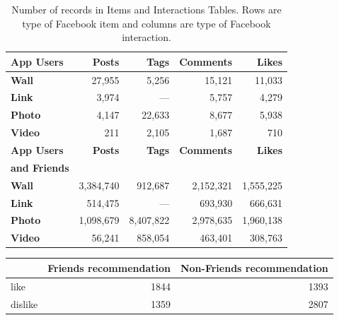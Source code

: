 \documentclass[letterpaper]{article}
\begin{document}
\begin{table}
	\centering
		\begin{tabular}{|>{\small}l|>{\small}r|>{\small}r|>{\small}r|>{\small}r|}
			\hline

			\textbf{App Users} & \textbf{Posts} & \textbf{Tags} & \textbf{Comments} & \textbf{Likes} \\
			\hline
			\textbf{Wall} & 27,955 & 5,256 & 15,121 & 11,033 \\
			\hline
			\textbf{Link} & 3,974 & --- & 5,757 & 4,279 \\
			\hline
			\textbf{Photo} & 4,147 & 22,633 & 8,677 & 5,938 \\
			\hline
			\textbf{Video} & 211 & 2,105 & 1,687 & 710 \\
			\hline
			\hline
			\textbf{App Users} & \textbf{Posts} & \textbf{Tags} & \textbf{Comments} & \textbf{Likes} \\
			\textbf{and Friends} & & & & \\
			\hline
			\textbf{Wall} & 3,384,740 & 912,687 & 2,152,321 & 1,555,225 \\
			\hline
			\textbf{Link} & 514,475 & --- & 693,930 & 666,631 \\
			\hline
			\textbf{Photo} & 1,098,679 & 8,407,822 & 2,978,635 & 1,960,138 \\
			\hline
			\textbf{Video} & 56,241 & 858,054 & 463,401 & 308,763 \\
			\hline
		\end{tabular}
	\caption{Number of records in Items and Interactions Tables. Rows are type of Facebook item and columns are type of Facebook interaction.}
	\label{tab:interactions}
\end{table}


\begin{table}
	\begin{tabular}{| >{\small}l | >{\small}r |>{\small}r |}
		\hline
		&Friends recommendation & Non-Friends recommendation\\
		\hline
		like & 1844 & 1393 \\
		\hline
		dislike & 1359 & 2807 \\
		\hline
	\end{tabular}
\end{table}
\end{document}
